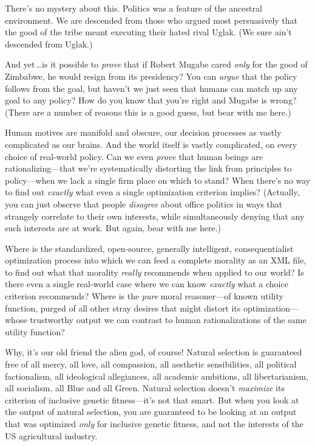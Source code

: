  There's no mystery about this. Politics was a
feature of the ancestral environment. We are descended from those who
argued most persuasively that the good of the tribe meant executing
their hated rival Uglak. (We sure ain't descended from
Uglak.)


 And yet\,\ldots is it possible to \textit{prove} that if Robert
Mugabe cared \textit{only} for the good of Zimbabwe, he would resign
from its presidency? You can \textit{argue} that the policy follows
from the goal, but haven't we just seen that humans can
match up any goal to any policy? How do you know that
you're right and Mugabe is wrong? (There are a number
of reasons this is a good guess, but bear with me here.)


 Human motives are manifold and obscure, our decision processes as
vastly complicated as our brains. And the world itself is vastly
complicated, on every choice of real-world policy. Can we even
\textit{prove} that human beings are rationalizing---that
we're systematically distorting the link from
principles to policy---when we lack a single firm place on which to
stand? When there's no way to find out \textit{exactly}
what even a single optimization criterion implies? (Actually, you can
just observe that people \textit{disagree} about office politics in
ways that strangely correlate to their own interests, while
simultaneously denying that any such interests are at work. But again,
bear with me here.)


 Where is the standardized, open-source, generally intelligent,
consequentialist optimization process into which we can feed a complete
morality as an XML file, to find out what that morality \textit{really}
recommends when applied to our world? Is there even a single real-world
case where we can know \textit{exactly} what a choice criterion
recommends? Where is the \textit{pure} moral reasoner---of known
utility function, purged of all other stray desires that might distort
its optimization---whose trustworthy output we can contrast to human
rationalizations of the same utility function?


 Why, it's our old friend the alien god, of course!
Natural selection is guaranteed free of all mercy, all love, all
compassion, all aesthetic sensibilities, all political factionalism,
all ideological allegiances, all academic ambitions, all
libertarianism, all socialism, all Blue and all Green. Natural
selection doesn't \textit{maximize} its criterion of
inclusive genetic fitness---it's not that smart. But
when you look at the output of natural selection, you are guaranteed to
be looking at an output that was optimized \textit{only} for inclusive
genetic fitness, and not the interests of the US agricultural
industry.


